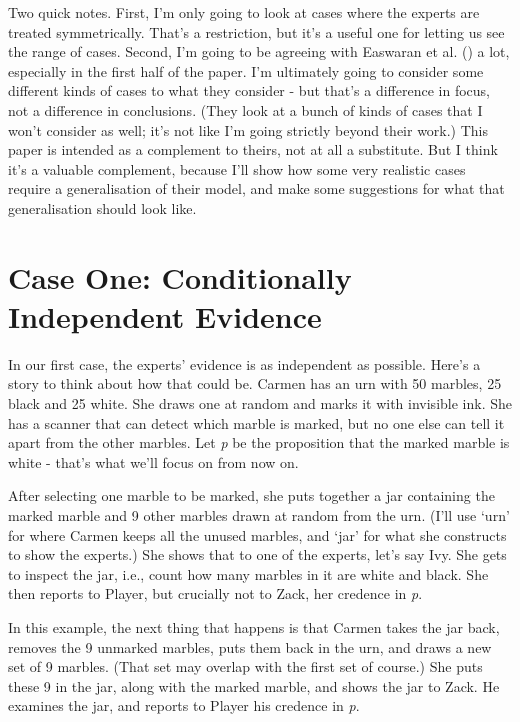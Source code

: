 \documentclass[
  11pt,
  letterpaper,
  DIV=11,
  numbers=noendperiod,
  twoside]{scrartcl}
\begin{document}
Two quick notes. First, I'm only going to look at cases where the
experts are treated symmetrically. That's a restriction, but it's a
useful one for letting us see the range of cases. Second, I'm going to
be agreeing with Easwaran et al. ()
a lot, especially in the first half of the paper. I'm ultimately going
to consider some different kinds of cases to what they consider - but
that's a difference in focus, not a difference in conclusions. (They
look at a bunch of kinds of cases that I won't consider as well; it's
not like I'm going strictly beyond their work.) This paper is intended
as a complement to theirs, not at all a substitute. But I think it's a
valuable complement, because I'll show how some very realistic cases
require a generalisation of their model, and make some suggestions for
what that generalisation should look like.

\section{Case One: Conditionally Independent
Evidence}\label{case-one-conditionally-independent-evidence}

In our first case, the experts' evidence is as independent as possible.
Here's a story to think about how that could be. Carmen has an urn with
50 marbles, 25 black and 25 white. She draws one at random and marks it
with invisible ink. She has a scanner that can detect which marble is
marked, but no one else can tell it apart from the other marbles. Let
\emph{p} be the proposition that the marked marble is white - that's
what we'll focus on from now on.

After selecting one marble to be marked, she puts together a jar
containing the marked marble and 9 other marbles drawn at random from
the urn. (I'll use `urn' for where Carmen keeps all the unused marbles,
and `jar' for what she constructs to show the experts.) She shows that
to one of the experts, let's say Ivy. She gets to inspect the jar, i.e.,
count how many marbles in it are white and black. She then reports to
Player, but crucially not to Zack, her credence in \emph{p}.

In this example, the next thing that happens is that Carmen takes the
jar back, removes the 9 unmarked marbles, puts them back in the urn, and
draws a new set of 9 marbles. (That set may overlap with the first set
of course.) She puts these 9 in the jar, along with the marked marble,
and shows the jar to Zack. He examines the jar, and reports to Player
his credence in \emph{p}.
\end{document}
